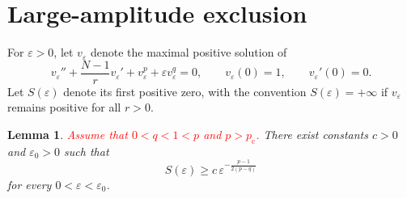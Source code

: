 \documentclass[11pt]{article}
\newcommand{\pc}{p_{\mathrm c}}
\newtheorem{lemma}[theorem]{Lemma}
\theoremstyle{definition}
\begin{document}
    


\section{Large-amplitude exclusion}

For $\varepsilon>0$, let $v_\varepsilon$ denote the maximal positive
solution of
\begin{equation}
\label{eq:veps}
v_\varepsilon''
+\frac{N-1}{r}v_\varepsilon'
+v_\varepsilon^p
+\varepsilon v_\varepsilon^q
=0,
\qquad
v_\varepsilon(0)=1,
\qquad
v_\varepsilon'(0)=0.
\end{equation}
Let $S(\varepsilon)$ denote its first positive zero, with the
convention
\(
S(\varepsilon)=+\infty
\)
if $v_\varepsilon$ remains positive for all $r>0$.

\begin{lemma}
\label{lem:S-lower}
\textcolor{red}{Assume that $0<q<1<p$ and $p>\pc$.}
There exist constants $c>0$ and $\varepsilon_0>0$ such that
\begin{equation}
\label{eq:Sbound}
S(\varepsilon)
\geq
c\,
\varepsilon^{-\frac{p-1}{2(p-q)}}
\end{equation}
for every $0<\varepsilon<\varepsilon_0$.
\end{lemma}
\end{document}
